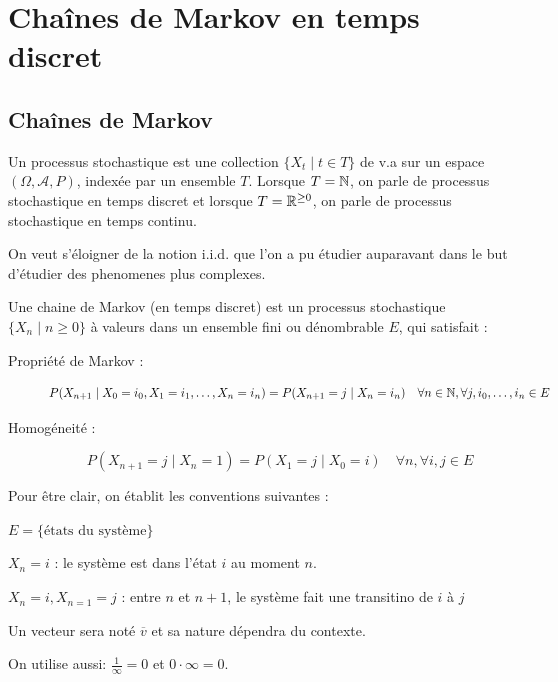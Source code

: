 \chapter{Chaînes de Markov en temps discret}

\section{Chaînes de Markov}

\begin{definition}
    Un processus stochastique est une collection $\{X_t\mid t\in T\}$ de v.a sur un espace $(\Omega,\mathcal{A}, P)$, indexée par un ensemble $T$. Lorsque $T= \mathbb{N}$, on parle de processus stochastique en temps discret et lorsque $T= \mathbb{R} ^{\ge0}$, on parle de processus stochastique en temps continu.
\end{definition}

On veut s'éloigner de la notion i.i.d. que l'on a pu étudier auparavant dans le but d'étudier des phenomenes plus complexes.

\begin{definition}
    Une chaine de Markov (en temps discret) est un processus stochastique $\{X_n\mid n\ge 0\}$ à valeurs dans un ensemble fini ou dénombrable $E$, qui satisfait :
    \begin{description}
        \item[Propriété de Markov : ]$$ P(X_{n+1}\mid X_0 = i_0, X_1 = i_1,\dotsc, X_n = i_n) = P(X_{n+1} = j\mid X_n = i_n) \quad \forall n \in \mathbb{N}, \forall j, i_0, \dotsc, i_n\in E$$ 
        \item[Homogéneité : ] $$P(X_{n+1}= j\mid X_n = 1)= P(X_1= j\mid X_0= i) \quad \forall n, \forall i,j \in E$$    
    \end{description}
\end{definition}
\begin{notation}
    Pour être clair, on établit les conventions suivantes :

    $E = \{\text{états du système\}}$

    $X_n = i$ : le système est dans l'état $i$ au moment $n$.

    $X_n = i, X_{n=1} = j$ : entre $n$ et $n+1$, le système fait une transitino de $i$ à $j$
    
    Un vecteur sera noté $\overline{v}$ et sa nature dépendra du contexte. 
    
    On utilise aussi: $\frac{1}{\infty}= 0$ et $0\cdot \infty = 0$.
\end{notation}

